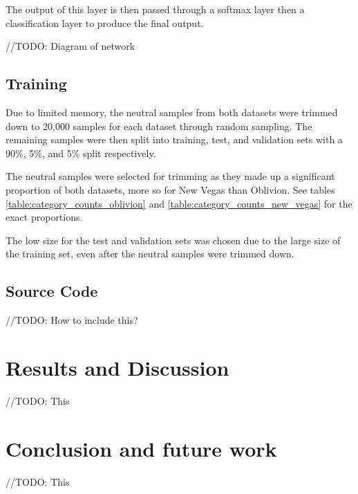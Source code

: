 \documentclass[journal]{IEEEtran}
\begin{document}
The output of this layer is then passed through a softmax layer then a classification layer
to produce the final output.

//TODO: Diagram of network

\subsection{Training}
Due to limited memory, the neutral samples from both datasets were trimmed down to 20,000
samples for each dataset through random sampling. The remaining samples were then split into training, test, and
validation sets with a 90\%, 5\%, and 5\% split respectively.

The neutral samples were selected for trimming as they made up a significant proportion of both
datasets, more so for New Vegas than Oblivion. See tables \ref{table:category_counts_oblivion}
and \ref{table:category_counts_new_vegas} for the exact proportions.

The low size for the test and validation sets was chosen due to the large size of the training set,
even after the neutral samples were trimmed down.

\subsection{Source Code}
//TODO: How to include this?

\section{Results and Discussion}
//TODO: This

\section{Conclusion and future work}
//TODO: This





\end{document}
